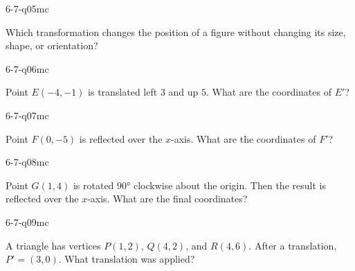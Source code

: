 \begin{practiceQuestion}{6-7-q05}{mc}
\begin{questionText}
Which transformation changes the position of a figure without changing its size, shape, or orientation?
\end{questionText}
\end{practiceQuestion}

\begin{practiceQuestion}{6-7-q06}{mc}
\begin{questionText}
Point $E(-4, -1)$ is translated left $3$ and up $5$. What are the coordinates of $E'$?
\end{questionText}
\end{practiceQuestion}

\begin{practiceQuestion}{6-7-q07}{mc}
\begin{questionText}
Point $F(0, -5)$ is reflected over the $x$-axis. What are the coordinates of $F'$?
\end{questionText}
\end{practiceQuestion}

\begin{practiceQuestion}{6-7-q08}{mc}
\begin{questionText}
Point $G(1, 4)$ is rotated $90°$ clockwise about the origin. Then the result is reflected over the $x$-axis. What are the final coordinates?
\end{questionText}
\end{practiceQuestion}

\begin{practiceQuestion}{6-7-q09}{mc}
\begin{questionText}
A triangle has vertices $P(1, 2)$, $Q(4, 2)$, and $R(4, 6)$. After a translation, $P' = (3, 0)$. What translation was applied?
\end{questionText}
\end{practiceQuestion}

